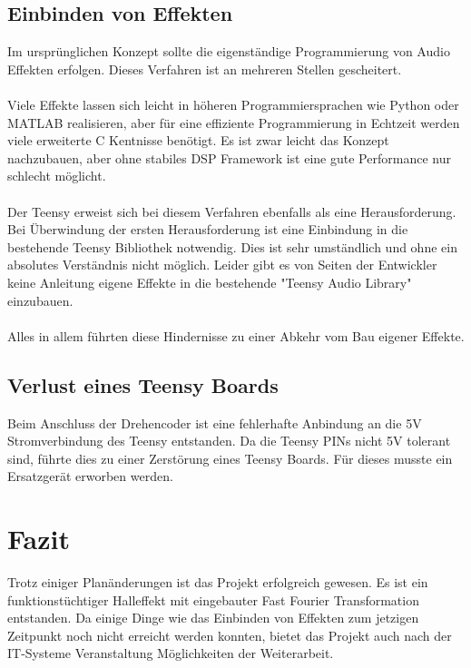 \documentclass[12pt]{article}
\begin{document}
\subsection{Einbinden von Effekten}
Im ursprünglichen Konzept sollte die eigenständige Programmierung von Audio Effekten erfolgen. 
Dieses Verfahren ist an mehreren Stellen gescheitert. 
\\
\\
Viele Effekte lassen sich leicht in höheren Programmiersprachen
wie Python oder MATLAB realisieren, aber für eine effiziente Programmierung in Echtzeit werden viele erweiterte C Kentnisse benötigt. 
Es ist zwar leicht das Konzept nachzubauen, aber ohne stabiles DSP Framework ist eine gute 
Performance nur schlecht möglicht. 
\\
\\
Der Teensy erweist sich bei diesem Verfahren ebenfalls als eine Herausforderung. Bei Überwindung der ersten Herausforderung 
ist eine Einbindung in die bestehende Teensy Bibliothek notwendig. Dies ist sehr umständlich und ohne ein absolutes Verständnis nicht möglich. 
Leider gibt es von Seiten der Entwickler keine Anleitung eigene Effekte in die bestehende "Teensy Audio Library" einzubauen. 
\\
\\
Alles in allem führten diese Hindernisse zu einer Abkehr vom Bau eigener Effekte.  
\subsection{Verlust eines Teensy Boards}
Beim Anschluss der Drehencoder ist eine fehlerhafte Anbindung an die 5V Stromverbindung des Teensy entstanden. 
Da die Teensy PINs nicht 5V tolerant sind, führte dies zu einer Zerstörung eines Teensy Boards.
Für dieses musste ein Ersatzgerät erworben werden. 

  
\section{Fazit}
Trotz einiger Planänderungen ist das Projekt erfolgreich gewesen. Es ist ein funktionstüchtiger Halleffekt mit eingebauter Fast Fourier Transformation
entstanden.
Da einige Dinge wie das Einbinden von Effekten zum jetzigen Zeitpunkt noch nicht erreicht werden konnten, bietet das Projekt auch nach der IT-Systeme 
Veranstaltung Möglichkeiten der Weiterarbeit. 
\end{document}
